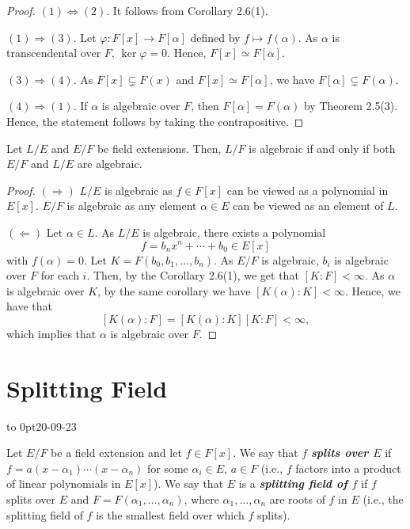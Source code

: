 \documentclass[twoside]{article}
\theoremstyle{remark}
\newcommand*\term[1]{\textbf{\textit{\mathversion{bold}#1}}}
\newcommand*\newclass[1]{\par\vbox to 0pt{\hbox{\tiny\sffamily\color{gray}#1}} \par\ignorespaces}
\begin{document}
\begin{proof}
  \((1) \Leftrightarrow (2)\). It follows from Corollary 2.6(1).
  
  \smallskip
  
  \((1) \Rightarrow (3)\). Let \(\varphi\colon F[x] \to F[\alpha]\) defined by \(f \mapsto f(\alpha)\). As \(\alpha\) is transcendental over \(F\), \(\ker\varphi = 0\). Hence, \(F[x] \simeq F[\alpha]\).
  
  \smallskip
  
  \((3) \Rightarrow (4)\). As \(F[x] \subsetneq F(x)\) and \(F[x] \simeq F[\alpha]\), we have \(F[\alpha] \subsetneq F(\alpha)\).
  
  \smallskip
  
  \((4) \Rightarrow (1)\). If \(\alpha\) is algebraic over \(F\), then \(F[\alpha] = F(\alpha)\) by Theorem 2.5(3). Hence, the statement follows by taking the contrapositive.
\end{proof}

\begin{proposition}
  Let \(L/E\) and \(E/F\) be field extensions. Then, \(L/F\) is algebraic if and only if both \(E/F\) and \(L/E\) are algebraic.
\end{proposition}

\begin{proof}
  \((\Rightarrow)\) \(L/E\) is algebraic as \(f \in F[x]\) can be viewed as a polynomial in \(E[x]\). \(E/F\) is algebraic as any element \(\alpha \in E\) can be viewed as an element of \(L\).
  
  \((\Leftarrow)\) Let \(\alpha \in L\). As \(L/E\) is algebraic, there exists a polynomial
  \[ f = b_n x^n + \cdots + b_0 \in E[x] \]
  with \(f(\alpha) = 0\). Let \(K = F(b_0, b_1, \dots, b_n)\). As \(E/F\) is algebraic, \(b_i\) is algebraic over \(F\) for each \(i\). Then, by the Corollary 2.6(1), we get that \([K:F] < \infty\). As \(\alpha\) is algebraic over \(K\), by the same corollary we have \([K(\alpha):K] < \infty\). Hence, we have that
  \[ [K(\alpha):F] = [K(\alpha):K] [K:F] < \infty, \]
  which implies that \(\alpha\) is algebraic over \(F\).
\end{proof}

\bigskip

\section{Splitting Field}

\newclass{20-09-23}

\begin{definition}
  Let \(E/F\) be a field extension and let \(f \in F[x]\). We say that \(f\) \term{splits over \(E\)} if \(f = a (x-\alpha_1) \cdots (x-\alpha_n)\) for some \(\alpha_i \in E\), \(a \in F\) (i.e., \(f\) factors into a product of linear polynomials in \(E[x]\)). We say that \(E\) is a \term{splitting field of \(f\)} if \(f\) splits over \(E\) and \(F = F(\alpha_1, \dots, \alpha_n)\), where \(\alpha_1, \dots, \alpha_n\) are roots of \(f\) in \(E\) (i.e., the splitting field of \(f\) is the smallest field over which \(f\) splits).
\end{definition}
\end{document}
